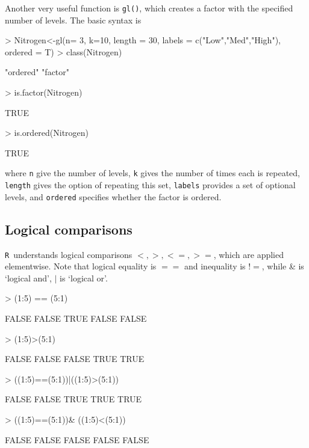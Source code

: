 \documentclass[12pt,A4,makeidx]{article}
\newcommand{\tR}{\texttt{R}}
\begin{document}
Another very useful function is \texttt{gl()}, which creates a factor with the specified number of levels. 
The basic syntax is
\begin{Schunk}
\begin{Sinput}
> Nitrogen<-gl(n= 3, k=10, length = 30, labels = c("Low","Med","High"), ordered = T)
> class(Nitrogen)
\end{Sinput}
\begin{Soutput}
[1] "ordered" "factor" 
\end{Soutput}
\begin{Sinput}
> is.factor(Nitrogen)
\end{Sinput}
\begin{Soutput}
[1] TRUE
\end{Soutput}
\begin{Sinput}
> is.ordered(Nitrogen)
\end{Sinput}
\begin{Soutput}
[1] TRUE
\end{Soutput}
\end{Schunk}
where \texttt{n} give the number of levels, \texttt{k} gives the number of times each is repeated, \texttt{length} gives the
option of repeating this set, \texttt{labels} provides a set of optional levels, and \texttt{ordered} specifies whether the
factor is ordered.

\subsection{Logical comparisons}
\tR\ understands logical comparisons $<,>,<=,>=$, which are applied elementwise. Note that logical equality is
$==$ and inequality is $!=$, while \& is `logical and', $\mid$ is `logical or'.
\begin{Schunk}
\begin{Sinput}
> (1:5) == (5:1)
\end{Sinput}
\begin{Soutput}
[1] FALSE FALSE  TRUE FALSE FALSE
\end{Soutput}
\begin{Sinput}
> (1:5)>(5:1)
\end{Sinput}
\begin{Soutput}
[1] FALSE FALSE FALSE  TRUE  TRUE
\end{Soutput}
\begin{Sinput}
> ((1:5)==(5:1))|((1:5)>(5:1))
\end{Sinput}
\begin{Soutput}
[1] FALSE FALSE  TRUE  TRUE  TRUE
\end{Soutput}
\begin{Sinput}
> ((1:5)==(5:1))& ((1:5)<(5:1))
\end{Sinput}
\begin{Soutput}
[1] FALSE FALSE FALSE FALSE FALSE
\end{Soutput}
\end{Schunk}
\end{document}
